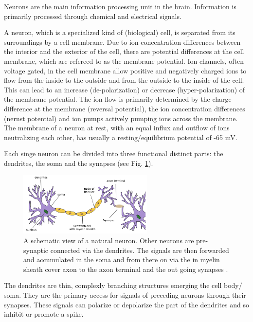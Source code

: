 Neurons are the main information processing unit in the brain\cite{gerstner2014neuronal}\cite{Byrne1997}. 
Information is primarily processed through chemical and electrical signals.

A neuron, which is a specialized kind of (biological) cell, is separated from its surroundings by a cell membrane.   
Due to ion concentration differences between the interior and the exterior of the cell, there are potential differences at the cell membrane, which are refereed to as the membrane potential. 
Ion channels, often voltage gated, in the cell membrane allow positive and negatively charged ions to flow from the inside to the outside and from the outside to the inside of the cell.
This can lead to an increase (de-polarization) or decrease (hyper-polarization) of the membrane potential.
The ion flow is primarily determined by the charge difference at the membrane (reversal potential), the ion concentration differences (nernst potential) and ion pumps actively pumping ions across the membrane.
The membrane of a neuron at rest, with an equal influx and outflow of ions neutralizing each other, has usually a resting/equilibrium potential of -65 mV. 

Each singe neuron can be divided into three functional distinct parts: the dendrites, the soma and the synapses (see Fig. \ref{fig:neuron}).

\begin{figure}[h]
	\centering
    	\includegraphics[width=0.6\textwidth]{imgs/neuron.png} 
    \caption{A schematic view of a natural neuron. Other neurons are pre-synaptic connected via the dendrites. The signals are then forwarded and accumulated in the soma and from there on via the in myelin sheath cover axon to the axon terminal and the out going synapses \cite{neuronImg}.}
	\label{fig:neuron}
\end{figure}

The dendrites are thin, complexly branching structures emerging the cell body/ soma.
They are the primary access for signals of preceding neurons through their synapses. 
These signals can polarize or depolarize the part of the dendrites and so inhibit or promote a spike. 

